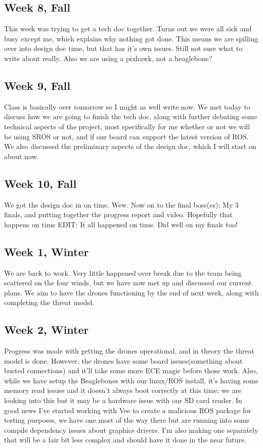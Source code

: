 \subsection{Week 8, Fall}
This week was trying to get a tech doc together. Turns out we were all sick and busy except me, which explains why 
nothing got done. This means we are spilling over into design doc time, but that has it's own issues. Still not sure what to write about really. Also we are using a pixhawk, not a beaglebone? 
\subsection{Week 9, Fall}
Class is basically over tomorrow so I might as well write now. We met today to discuss how we are going to finish the tech doc, along with further debating some technical aspects of the project, most specifically for me whether or not we will be using SROS or not, and if our board can support the latest version of ROS. We also discussed the preliminary aspects of the design doc, which I will start on about now.
\subsection{Week 10, Fall}
We got the design doc in on time. Wew. Now on to the final boss(es): My 3 finals, and putting together the progress report and video. Hopefully that happens on time
EDIT: It all happened on time. Did well on my finals too!
\subsection{Week 1, Winter}
We are back to work. Very little happened over break due to the team being scattered on the four winds, but we have now met up and discussed our current plans. We aim to have the drones functioning by the end of next week, along with completing the threat model. 
\subsection{Week 2, Winter}
Progress was made with getting the drones operational, and in theory the threat model is done. However, the drones have some board issues(something about busted connections) and it'll take some more ECE magic before those work. Also, while we have setup the Beaglebones with our linux/ROS install, it's having some memory read issues and it doesn't always boot correctly at this time; we are looking into this but it may be a hardware issue with our SD card reader. In good news I've started working with Vee to create a malicious ROS package for testing purposes, we have one most of the way there but are running into some compile dependency issues about graphics drivers. I'm also making one separately that will be a fair bit less complex and should have it done in the near future.
